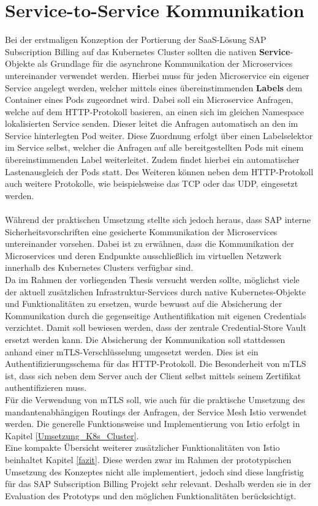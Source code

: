 \section{Service-to-Service Kommunikation}
\label{Konzeption_S2S_Kommunikation}
Bei der erstmaligen Konzeption der Portierung der \ac{SaaS}-Lösung SAP Subscription Billing auf das Kubernetes Cluster sollten die nativen \textbf{Service}-Objekte als Grundlage für die asynchrone Kommunikation der Microservices untereinander verwendet werden. Hierbei muss für jeden Microservice ein eigener Service angelegt werden, welcher mittels eines übereinstimmenden \textbf{Labels} dem Container eines Pods zugeordnet wird. Dabei soll ein Microservice Anfragen, welche auf dem \ac{HTTP}-Protokoll basieren, an einen sich im gleichen Namespace lokalisierten Service senden. Dieser leitet die Anfragen automatisch an den im Service hinterlegten Pod weiter. Diese Zuordnung erfolgt über einen Labelselektor im Service selbst, welcher die Anfragen auf alle bereitgestellten Pods mit einem übereinstimmenden Label weiterleitet. Zudem findet hierbei ein automatischer Lastenausgleich der Pods statt. Des Weiteren können neben dem \ac{HTTP}-Protokoll auch weitere Protokolle, wie beispielsweise das \ac{TCP} oder das \ac{UDP}, eingesetzt werden.\autocite[Vgl.][Supported protocols]{KubernetesAuthors.20200115}\\
\\
Während der praktischen Umsetzung stellte sich jedoch heraus, dass SAP interne Sicherheitsvorschriften eine gesicherte Kommunikation der Microservices untereinander vorsehen. Dabei ist zu erwähnen, dass die Kommunikation der Microservices und deren Endpunkte ausschließlich im virtuellen Netzwerk innerhalb des Kubernetes Clusters verfügbar sind.\\
Da im Rahmen der vorliegenden Thesis versucht werden sollte, möglichst viele der aktuell zusätzlichen Infrastruktur-Services durch native Kubernetes-Objekte und Funktionalitäten zu ersetzen, wurde bewusst auf die Absicherung der Kommunikation durch die gegenseitige Authentifikation mit eigenen Credentials verzichtet. Damit soll bewiesen werden, dass der zentrale Credential-Store Vault ersetzt werden kann. 
Die Absicherung der Kommunikation soll stattdessen anhand einer \ac{mTLS}-Verschlüsselung umgesetzt werden. Dies ist ein Authentifizierungsschema für das \ac{HTTP}-Protokoll. 
\newpage
Die Besonderheit von \ac{mTLS} ist, dass sich neben dem Server auch der Client selbst mittels seinem Zertifikat authentifizieren muss.\autocite[Vgl.][S. 4-5]{Oiwa.2017}
\\
Für die Verwendung von \ac{mTLS} soll, wie auch für die praktische Umsetzung des mandantenabhängigen Routings der Anfragen, der Service Mesh Istio verwendet werden. Die generelle Funktionsweise und Implementierung von Istio erfolgt in Kapitel \ref{Umsetzung_K8s_Cluster}.\\ 
Eine kompakte Übersicht weiterer zusätzlicher Funktionalitäten von Istio beinhaltet Kapitel \ref{fazit}. Diese werden zwar im Rahmen der prototypischen Umsetzung des Konzeptes nicht alle implementiert, jedoch sind diese langfristig für das SAP Subscription Billing Projekt sehr relevant. Deshalb werden sie in der Evaluation des Prototyps und den möglichen Funktionalitäten berücksichtigt.

